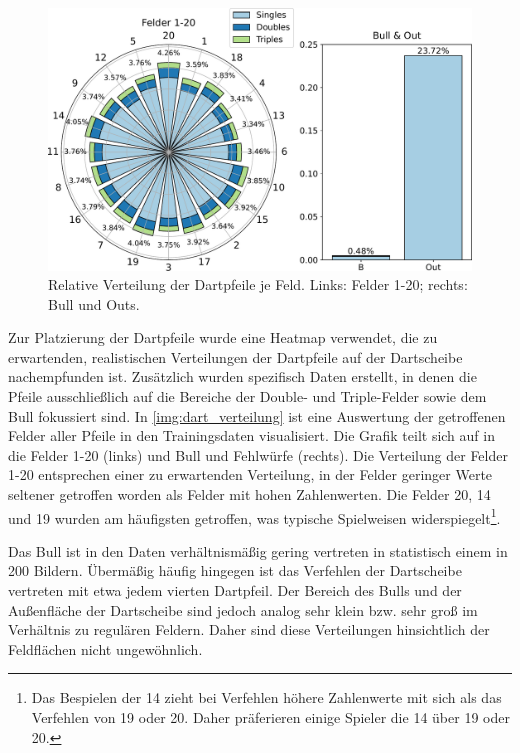 \begin{figure}
    \centering
    \includegraphics[width=\textwidth]{imgs/rendering/ergebnisse/dartboard_stacked_final.pdf}
    \caption{Relative Verteilung der Dartpfeile je Feld. Links: Felder 1-20; rechts: Bull und Outs.}
    \label{img:dart_verteilung}
\end{figure}

Zur Platzierung der Dartpfeile wurde eine Heatmap verwendet, die zu erwartenden, realistischen Verteilungen der Dartpfeile auf der Dartscheibe nachempfunden ist. Zusätzlich wurden spezifisch Daten erstellt, in denen die Pfeile ausschließlich auf die Bereiche der Double- und Triple-Felder sowie dem Bull fokussiert sind. In \autoref{img:dart_verteilung} ist eine Auswertung der getroffenen Felder aller Pfeile in den Trainingsdaten visualisiert. Die Grafik teilt sich auf in die Felder 1-20 (links) und Bull und Fehlwürfe (rechts). Die Verteilung der Felder 1-20 entsprechen einer zu erwartenden Verteilung, in der Felder geringer Werte seltener getroffen worden als Felder mit hohen Zahlenwerten. Die Felder 20, 14 und 19 wurden am häufigsten getroffen, was typische Spielweisen widerspiegelt\footnote{Das Bespielen der 14 zieht bei Verfehlen höhere Zahlenwerte mit sich als das Verfehlen von 19 oder 20. Daher präferieren einige Spieler die 14 über 19 oder 20.}.

Das Bull ist in den Daten verhältnismäßig gering vertreten in statistisch einem in 200 Bildern. Übermäßig häufig hingegen ist das Verfehlen der Dartscheibe vertreten mit etwa jedem vierten Dartpfeil. Der Bereich des Bulls und der Außenfläche der Dartscheibe sind jedoch analog sehr klein bzw. sehr groß im Verhältnis zu regulären Feldern. Daher sind diese Verteilungen hinsichtlich der Feldflächen nicht ungewöhnlich.

